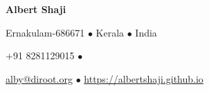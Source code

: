 {\LARGE\bfseries Albert Shaji}
\bigskip


Ernakulam-686671 {\scriptsize $\bullet$}
Kerala {\scriptsize $\bullet$}
India

+91 8281129015 {\scriptsize $\bullet$}

\href{mailto:alby@disroot.org}{alby@diroot.org} {\scriptsize $\bullet$}
\href{https://albertshaji.github.io/}{https://albertshaji.github.io}

